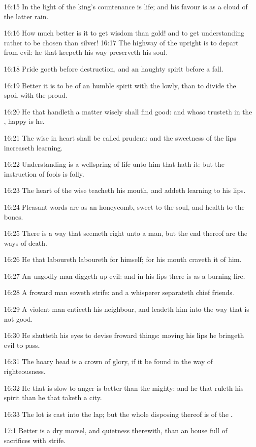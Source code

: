 16:15 In the light of the king's countenance is life; and his favour
is as a cloud of the latter rain.

16:16 How much better is it to get wisdom than gold! and to get
understanding rather to be chosen than silver!  16:17 The highway of
the upright is to depart from evil: he that keepeth his way preserveth
his soul.

16:18 Pride goeth before destruction, and an haughty spirit before a
fall.

16:19 Better it is to be of an humble spirit with the lowly, than to
divide the spoil with the proud.

16:20 He that handleth a matter wisely shall find good: and whoso
trusteth in the \LORD, happy is he.

16:21 The wise in heart shall be called prudent: and the sweetness of
the lips increaseth learning.

16:22 Understanding is a wellspring of life unto him that hath it: but
the instruction of fools is folly.

16:23 The heart of the wise teacheth his mouth, and addeth learning to
his lips.

16:24 Pleasant words are as an honeycomb, sweet to the soul, and
health to the bones.

16:25 There is a way that seemeth right unto a man, but the end
thereof are the ways of death.

16:26 He that laboureth laboureth for himself; for his mouth craveth
it of him.

16:27 An ungodly man diggeth up evil: and in his lips there is as a
burning fire.

16:28 A froward man soweth strife: and a whisperer separateth chief
friends.

16:29 A violent man enticeth his neighbour, and leadeth him into the
way that is not good.

16:30 He shutteth his eyes to devise froward things: moving his lips
he bringeth evil to pass.

16:31 The hoary head is a crown of glory, if it be found in the way of
righteousness.

16:32 He that is slow to anger is better than the mighty; and he that
ruleth his spirit than he that taketh a city.

16:33 The lot is cast into the lap; but the whole disposing thereof is
of the \LORD.

17:1 Better is a dry morsel, and quietness therewith, than an house
full of sacrifices with strife.

